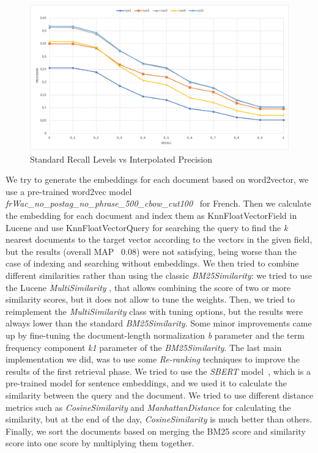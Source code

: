 \begin{figure}[h!]
    \includegraphics[width=\textwidth]{figure/PRgraph.png}
    \caption{Standard Recall Levels vs Interpolated Precision}
    \label{fig:recallPrecision}
\end{figure}

We try to generate the embeddings for each document based on word2vector, we use a pre-trained word2vec model \textit{frWac\_no\_postag\_no\_phrase\_500\_cbow\_cut100}~\cite{fauconnier_2015} for French. Then we calculate the embedding for each document and index them as KnnFloatVectorField in Lucene and use KnnFloatVectorQuery \cite{lucene-knnvectorfield} for searching the query to find the \textit{k} nearest documents to the target vector according to the vectors in the given field, but the results (overall \ac{MAP} ~0.08) were not satisfying, being worse than the case of indexing and searching without embeddings.
\newline
We then tried to combine different similarities rather than using the classic \textit{BM25Similarity}: we tried to use the Lucene \textit{MultiSimilarity} \cite{lucenemultisimilarity}, that allows combining the score of two or more similarity scores, but it does not allow to
tune the weights. Then, we tried to reimplement the \textit{MultiSimilarity} class with tuning options, but the results were always lower than the standard \textit{BM25Similarity}. Some minor improvements came up by fine-tuning the document-length
normalization \textit{b} parameter and the term frequency component \textit{k1} parameter of the \textit{BM25Similarity}.
\newline
The last main implementation we did, was to use some \textit{Re-ranking} techniques to improve the results of the first retrieval phase.
We tried to use the \textit{SBERT} model~\cite{reimers-2019-sentence-bert}, which is a pre-trained model for sentence embeddings, and we used it to calculate the similarity between the query and the document.
We tried to use different distance metrics such as \textit{CosineSimilarity} \cite{pytorch-cosinesimilarity} and \textit{ManhattanDistance} \cite{dads-manhattandistance} for calculating the similarity, but at the end of the day, \textit{CosineSimilarity} is much better than others.
Finally, we sort the documents based on merging the BM25 score and similarity score into one score by multiplying them together.

